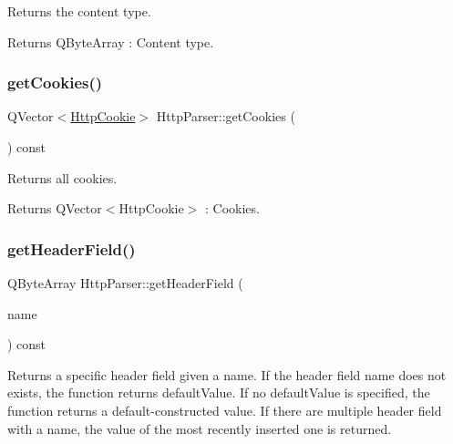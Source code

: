 Returns the content type. 

\begin{DoxyReturn}{Returns}
Q\+Byte\+Array \+: Content type. 
\end{DoxyReturn}
\mbox{\label{class_http_parser_a0530139afe4e8cbd216b3bd2112ebf49}} 
\subsubsection{\texorpdfstring{get\+Cookies()}{getCookies()}}
{\footnotesize\ttfamily Q\+Vector$<$\hyperlink{class_http_cookie}{Http\+Cookie}$>$ Http\+Parser\+::get\+Cookies (\begin{DoxyParamCaption}{ }\end{DoxyParamCaption}) const\hspace{0.3cm}{\ttfamily [inline]}}



Returns all cookies. 

\begin{DoxyReturn}{Returns}
Q\+Vector$<$\+Http\+Cookie$>$ \+: Cookies. 
\end{DoxyReturn}
\mbox{\label{class_http_parser_aa754b731300bd5cf6dc82fa038089aaa}} 
\subsubsection{\texorpdfstring{get\+Header\+Field()}{getHeaderField()}}
{\footnotesize\ttfamily Q\+Byte\+Array Http\+Parser\+::get\+Header\+Field (\begin{DoxyParamCaption}\item[{const Q\+Byte\+Array \&}]{name }\end{DoxyParamCaption}) const\hspace{0.3cm}{\ttfamily [inline]}}



Returns a specific header field given a name. If the header field name does not exists, the function returns default\+Value. If no default\+Value is specified, the function returns a default-\/constructed value. If there are multiple header field with a name, the value of the most recently inserted one is returned. 


